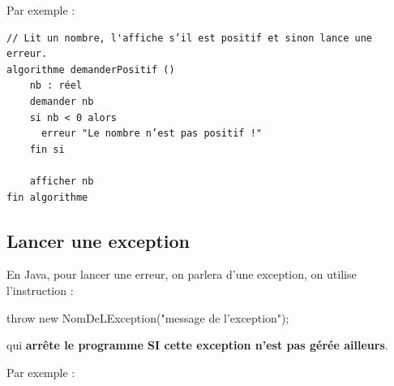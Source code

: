 \documentclass[11pt,a4paper]{article}
\begin{document}
            \par
        
          Par exemple : 
        
            \par
        \begin{verbatim}
// Lit un nombre, l'affiche s’il est positif et sinon lance une erreur.
algorithme demanderPositif ()
    nb : réel
    demander nb
    si nb < 0 alors
      erreur "Le nombre n’est pas positif !"
    fin si
    
    afficher nb
fin algorithme
        \end{verbatim}\subsection{Lancer une exception}En Java, pour lancer une erreur, on parlera d'une exception, on utilise l'instruction : 
            \par
        \begin{Java}
throw new NomDeLException("message de l'exception");
        \end{Java}qui \textbf{arr\^ete le programme SI cette exception n'est pas g\'er\'ee ailleurs}.
            \par
        
          Par exemple : 
        
\end{document}
